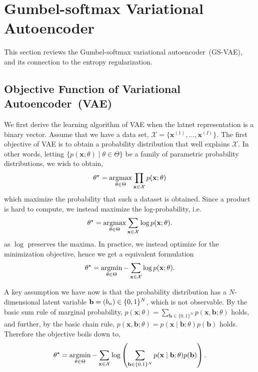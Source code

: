 \documentclass[10pt,letterpaper]{article}
\newcommand{\argmin}{\mathop{\rm argmin}}
\newcommand{\argmax}{\mathop{\rm argmax}}
\begin{document}
\section{Gumbel-softmax Variational Autoencoder}
This section reviews the Gumbel-softmax variational autoencoder~(GS-VAE), and its connection to the entropy regularization.

\subsection{Objective Function of Variational Autoencoder~(VAE)}
We first derive the learning algorithm of VAE when the latnet representation is a binary vector.
Assume that we have a data set, $\mathcal{X}=\{\mathbf{x}^{(1)},\dots,\mathbf{x}^{(I)}\}$.
The first objective of VAE is to obtain a probability distribution that well explains $\mathcal{X}$.
In other words, letting $\{p(\mathbf{x};\theta) \mid \theta\in\Theta\}$ be a family of parametric probability distributions, we wish to obtain,
\begin{align*}
\theta^\star = \argmax_{\theta\in\Theta} \prod_{\mathbf{x}\in \mathcal{X}} p(\mathbf{x};\theta)
\end{align*}
which maximize the probability that such a dataset is obtained. Since a product is hard to compute, we instead maximize the log-probability, i.e.
\begin{align*}
\theta^\star = \argmax_{\theta\in\Theta} \sum_{\mathbf{x}\in \mathcal{X}} \log p(\mathbf{x};\theta).
\end{align*}
as $\log$ preserves the maxima.
In practice, we instead optimize for the minimization objective, hence we get a equivalent formulation
\begin{align*}
\theta^\star = \argmin_{\theta\in\Theta} - \sum_{\mathbf{x}\in \mathcal{X}} \log p(\mathbf{x};\theta).
\end{align*}


A key assumption we have now is that the probability distribution has a $N$-dimensional latent variable $\mathbf{b}={\left(b_n\right)}\in\{0,1\}^N$, which is not observable.
By the basic sum rule of marginal probability,
$p(\mathbf{x};\theta) = \sum_{\mathbf{b}\in\{0,1\}^N}p(\mathbf{x}, \mathbf{b};\theta)$ holds, and further,
by the basic chain rule,
$p(\mathbf{x}, \mathbf{b};\theta) = p(\mathbf{x} \mid \mathbf{b};\theta)p(\mathbf{b})$ holds.
Therefore the objective boils down to,
\begin{align}
\label{eq:vae-obj} \theta^\star = \argmin_{\theta\in\Theta} -\sum_{\mathbf{x}\in \mathcal{X}} \log \left(\sum_{\mathbf{b}\in\{0,1\}^N}p(\mathbf{x} \mid \mathbf{b};\theta)p(\mathbf{b})\right).
\end{align}
\end{document}

